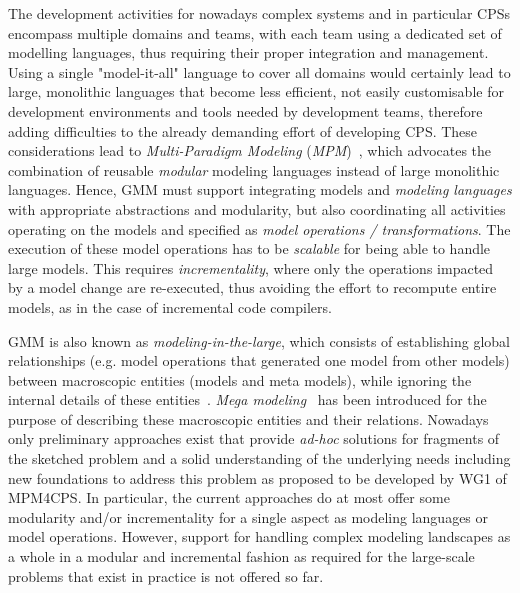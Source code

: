 The development activities for nowadays complex systems and in particular
CPSs encompass multiple domains and teams, with each team using a dedicated set of
modelling languages, thus requiring their proper integration and management. Using a single "model-it-all" language to cover all domains would certainly lead to large, monolithic languages that become less efficient, not easily customisable for development environments and tools needed by development teams, therefore adding difficulties to the already demanding effort of developing CPS. These considerations lead to \emph{Multi-Paradigm Modeling} (\emph{MPM})~\cite{VangheluweAIS2002}, which advocates the combination of reusable \emph{modular} modeling languages instead  of large monolithic languages.
Hence, GMM must support integrating models and \textit{modeling languages} with appropriate abstractions and modularity, but also coordinating all activities
operating on the models and specified as \textit{model operations /
transformations}. The execution of these model operations has to be \emph{scalable} for being able to handle large models.  This requires \emph{incrementality}, where only the  operations impacted by a model change are re-executed, thus avoiding the effort to recompute entire models, as in the case of incremental code compilers.

GMM is also known as \emph{modeling-in-the-large}, which consists of
establishing global relationships (e.g. model operations that generated one
model from other models) between macroscopic entities (models and meta models),
while ignoring the internal details of these entities~\cite{BJRV05}. \emph{Mega
modeling}~\cite{Bezivin+2004,Favre04foundationsof} has been introduced for the
purpose of describing these macroscopic entities and their relations.
Nowadays only preliminary approaches exist that provide \emph{ad-hoc} solutions 
for fragments of the sketched problem and a solid
understanding of the underlying needs including new foundations to 
address this problem as proposed to be developed by WG1 of MPM4CPS.
In particular, the current approaches do at most offer some modularity and/or
incrementality for a single aspect as modeling languages or model operations.
However, support for handling complex modeling landscapes as a whole in a
modular and incremental fashion as required for the large-scale problems that
exist in practice is not offered so far.

